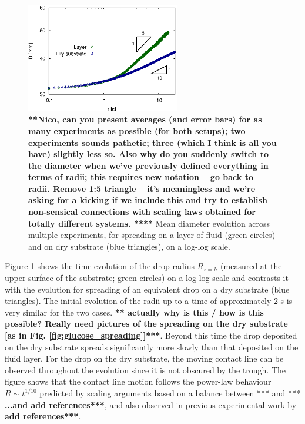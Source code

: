 \documentclass[aip,graphicx]{revtex4-1}
\begin{document}
\begin{figure}[!ht]
\centering
\includegraphics[width=0.6\textwidth]{figures/diam_vs_time_comp_layer_dry.eps}
\caption{{\bf ***Nico, can you present averages (and error bars) for as
  many experiments as possible (for both setups); two experiments
  sounds pathetic; three (which I think is all you have) slightly 
  less so. Also why do you suddenly switch to
  the diameter when we've previously defined everything in terms of
  radii; this requires new notation -- go back to radii. 
  Remove 1:5 triangle -- it's meaningless and we're asking for
  a kicking if we include this and try to establish non-sensical
  connections with scaling laws obtained for totally different
  systems. ****} Mean diameter evolution across multiple experiments, for
  spreading on a layer of fluid (green circles) and on dry substrate
  (blue triangles), on a log-log
  scale. }
\label{fig:diam_vs_time_comp_layer_dry}
\end{figure}


Figure \ref{fig:diam_vs_time_comp_layer_dry} shows the time-evolution
of the drop radius $R_{z=h}$ (measured at the upper surface
of the substrate; green circles) on a log-log scale and
contrasts it with the evolution for spreading of an equivalent drop 
on a dry substrate (blue triangles). The initial evolution 
of the radii up to a time of approximately 2 s is very similar for the two 
cases. {\bf *** actually why is this /  how is this possible? Really
  need pictures of the spreading on the dry substrate [as in Fig.
\ref{fig:glucose_spreading}]***}.
Beyond this time the drop deposited on the dry substrate spreads
significantly more slowly than that deposited on the fluid layer.
For the drop on the dry substrate, the moving contact line can be
observed throughout the evolution since it is not obscured by the
trough. The figure shows that the contact line motion follows
the power-law behaviour $R \sim t^{1/10}$ predicted by scaling
arguments based on a balance between *** and *** {\bf ...and add 
references***}, and also observed in previous experimental work by {\bf  add 
references***}.
\end{document}
